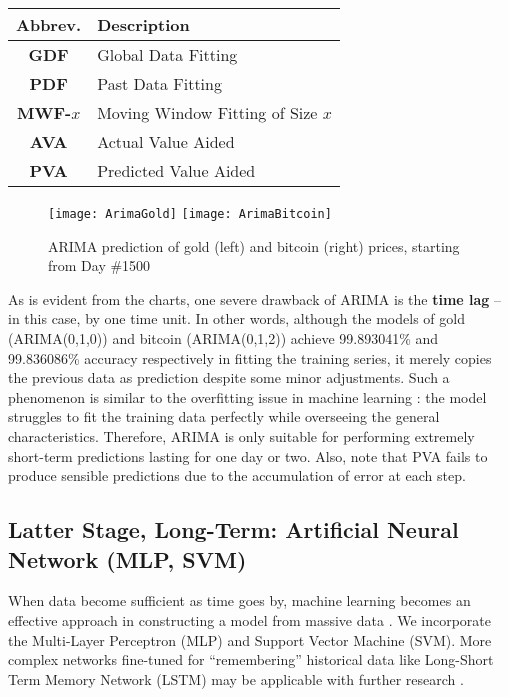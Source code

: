 \documentclass{mcmthesis}
\begin{document}
{	\begin{center}
		\begin{tabular}{cl}
			\toprule
			Abbrev. & Description \\ \midrule
			\textbf{GDF} & Global Data Fitting \\
			\textbf{PDF} & Past Data Fitting \\
			\textbf{MWF-$x$} & Moving Window Fitting of Size $x$ \\
			\textbf{AVA} & Actual Value Aided \\
			\textbf{PVA} & Predicted Value Aided \\
			\bottomrule
		\end{tabular}
	\end{center}
	
	\begin{figure}[h]
		\centering \texttt{[image: ArimaGold]}
		\centering \texttt{[image: ArimaBitcoin]}
		\caption{ARIMA prediction of gold (left) and bitcoin (right) prices, starting from Day \#1500}
	\end{figure}
	
	As is evident from the charts, one severe drawback of ARIMA is the \textbf{time lag} -- in this case, by one time unit. In other words, although the models of gold (ARIMA(0,1,0)) and bitcoin (ARIMA(0,1,2)) achieve 99.893041\% and 99.836086\% accuracy respectively in fitting the training series, it merely copies the previous data as prediction despite some minor adjustments. Such a phenomenon is similar to the overfitting issue in machine learning \cite{OVERFIT}: the model struggles to fit the training data perfectly while overseeing the general characteristics. Therefore, ARIMA is only suitable for performing extremely short-term predictions lasting for one day or two. Also, note that PVA fails to produce sensible predictions due to the accumulation of error at each step. 
	
	\subsection{Latter Stage, Long-Term: Artificial Neural Network (MLP, SVM)}
	\label{sec:3.3}
	
	When data become sufficient as time goes by, machine learning becomes an effective approach in constructing a model from massive data \cite{ML}. We incorporate the Multi-Layer Perceptron (MLP) and Support Vector Machine (SVM). More complex networks fine-tuned for ``remembering'' historical data like Long-Short Term Memory Network (LSTM) may be applicable with further research \cite{LSTM}. 
	
}
\end{document}
